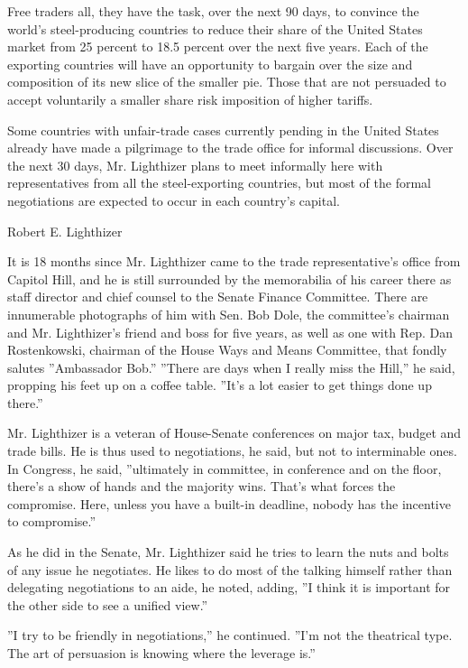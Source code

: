 Free traders all, they have the task, over the next 90 days, to convince
the world's steel-producing countries to reduce their share of the
United States market from 25 percent to 18.5 percent over the next five
years. Each of the exporting countries will have an opportunity to
bargain over the size and composition of its new slice of the smaller
pie. Those that are not persuaded to accept voluntarily a smaller share
risk imposition of higher tariffs.

Some countries with unfair-trade cases currently pending in the United
States already have made a pilgrimage to the trade office for informal
discussions. Over the next 30 days, Mr. Lighthizer plans to meet
informally here with representatives from all the steel-exporting
countries, but most of the formal negotiations are expected to occur in
each country's capital.

Robert E. Lighthizer

It is 18 months since Mr. Lighthizer came to the trade representative's
office from Capitol Hill, and he is still surrounded by the memorabilia
of his career there as staff director and chief counsel to the Senate
Finance Committee. There are innumerable photographs of him with Sen.
Bob Dole, the committee's chairman and Mr. Lighthizer's friend and boss
for five years, as well as one with Rep. Dan Rostenkowski, chairman of
the House Ways and Means Committee, that fondly salutes ''Ambassador
Bob.'' ''There are days when I really miss the Hill,'' he said, propping
his feet up on a coffee table. ''It's a lot easier to get things done up
there.''

Mr. Lighthizer is a veteran of House-Senate conferences on major tax,
budget and trade bills. He is thus used to negotiations, he said, but
not to interminable ones. In Congress, he said, ''ultimately in
committee, in conference and on the floor, there's a show of hands and
the majority wins. That's what forces the compromise. Here, unless you
have a built-in deadline, nobody has the incentive to compromise.''

As he did in the Senate, Mr. Lighthizer said he tries to learn the nuts
and bolts of any issue he negotiates. He likes to do most of the talking
himself rather than delegating negotiations to an aide, he noted,
adding, ''I think it is important for the other side to see a unified
view.''

''I try to be friendly in negotiations,'' he continued. ''I'm not the
theatrical type. The art of persuasion is knowing where the leverage
is.''

